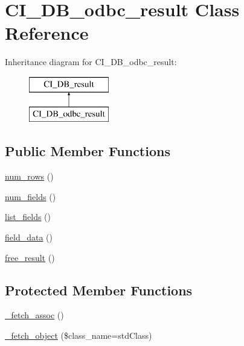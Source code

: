 \hypertarget{class_c_i___d_b__odbc__result}{}\section{C\+I\+\_\+\+D\+B\+\_\+odbc\+\_\+result Class Reference}
\label{class_c_i___d_b__odbc__result}
Inheritance diagram for C\+I\+\_\+\+D\+B\+\_\+odbc\+\_\+result\+:\begin{figure}[H]
\begin{center}
\leavevmode
\includegraphics[height=2.000000cm]{class_c_i___d_b__odbc__result}
\end{center}
\end{figure}
\subsection*{Public Member Functions}
\begin{DoxyCompactItemize}
\item 
\mbox{\hyperlink{class_c_i___d_b__odbc__result_adcc5771ea85cea37381c9e8fccff6175}{num\+\_\+rows}} ()
\item 
\mbox{\hyperlink{class_c_i___d_b__odbc__result_aa45c21887dd286ff0f8f12bcbda52f45}{num\+\_\+fields}} ()
\item 
\mbox{\hyperlink{class_c_i___d_b__odbc__result_a006ba2298bbb9277ed4154ef5eb60cf2}{list\+\_\+fields}} ()
\item 
\mbox{\hyperlink{class_c_i___d_b__odbc__result_a140a2f2b2edc953520d5309fa402d549}{field\+\_\+data}} ()
\item 
\mbox{\hyperlink{class_c_i___d_b__odbc__result_a6b82acd7ef132185720902d30d055bdd}{free\+\_\+result}} ()
\end{DoxyCompactItemize}
\subsection*{Protected Member Functions}
\begin{DoxyCompactItemize}
\item 
\mbox{\hyperlink{class_c_i___d_b__odbc__result_a601b32725440d09d78427d27b19b8509}{\+\_\+fetch\+\_\+assoc}} ()
\item 
\mbox{\hyperlink{class_c_i___d_b__odbc__result_a29e004e2b289ce17dbe1ac37ca69de9c}{\+\_\+fetch\+\_\+object}} (\$class\+\_\+name=\textquotesingle{}std\+Class\textquotesingle{})
\end{DoxyCompactItemize}
